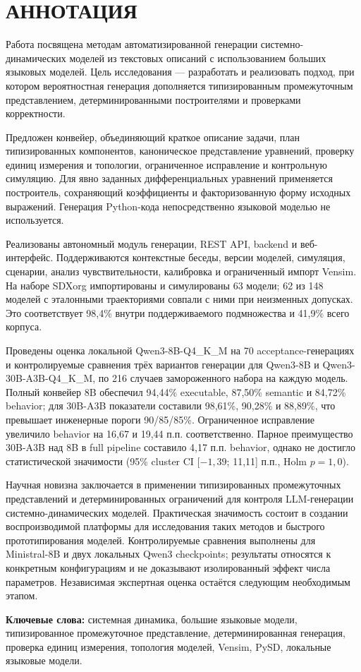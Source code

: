 \chapter*{АННОТАЦИЯ}

Работа посвящена методам автоматизированной генерации системно-динамических моделей из текстовых описаний с использованием больших языковых моделей. Цель исследования --- разработать и реализовать подход, при котором вероятностная генерация дополняется типизированным промежуточным представлением, детерминированными построителями и проверками корректности.

Предложен конвейер, объединяющий краткое описание задачи, план типизированных компонентов, каноническое представление уравнений, проверку единиц измерения и топологии, ограниченное исправление и контрольную симуляцию. Для явно заданных дифференциальных уравнений применяется построитель, сохраняющий коэффициенты и факторизованную форму исходных выражений. Генерация Python-кода непосредственно языковой моделью не используется.

Реализованы автономный модуль генерации, REST API, backend и веб-интерфейс. Поддерживаются контекстные беседы, версии моделей, симуляция, сценарии, анализ чувствительности, калибровка и ограниченный импорт Vensim. На наборе SDXorg импортированы и симулированы 63 модели; 62 из 148 моделей с эталонными траекториями совпали с ними при неизменных допусках. Это соответствует 98,4\% внутри поддерживаемого подмножества и 41,9\% всего корпуса.

Проведены оценка локальной Qwen3-8B-Q4\_K\_M на 70 acceptance-генерациях и контролируемые сравнения трёх вариантов генерации для Qwen3-8B и Qwen3-30B-A3B-Q4\_K\_M, по 216 случаев замороженного набора на каждую модель. Полный конвейер 8B обеспечил 94,44\% executable, 87,50\% semantic и 84,72\% behavior; для 30B-A3B показатели составили 98,61\%, 90,28\% и 88,89\%, что превышает инженерные пороги 90/85/85\%. Ограниченное исправление увеличило behavior на 16,67 и 19,44 п.п. соответственно. Парное преимущество 30B-A3B над 8B в full pipeline составило 4,17 п.п. behavior, однако не достигло статистической значимости (95\% cluster CI [$-1,39$; 11,11] п.п., Holm $p=1{,}0$).

Научная новизна заключается в применении типизированных промежуточных представлений и детерминированных ограничений для контроля LLM-генерации системно-динамических моделей. Практическая значимость состоит в создании воспроизводимой платформы для исследования таких методов и быстрого прототипирования моделей. Контролируемые сравнения выполнены для Ministral-8B и двух локальных Qwen3 checkpoints; результаты относятся к конкретным конфигурациям и не доказывают изолированный эффект числа параметров. Независимая экспертная оценка остаётся следующим необходимым этапом.

\textbf{Ключевые слова:} системная динамика, большие языковые модели, типизированное промежуточное представление, детерминированная генерация, проверка единиц измерения, топология моделей, Vensim, PySD, локальные языковые модели.
